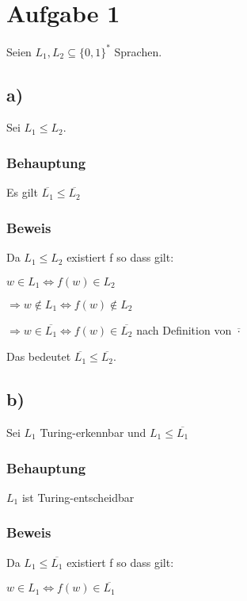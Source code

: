 \section*{Aufgabe 1}

Seien $L_1, L_2 \subseteq \{0,1\}^*$ Sprachen.

\subsection*{a)}

Sei $L_1 \leq L_2$.

\subsubsection*{Behauptung}

Es gilt $\overline{L_1} \leq \overline{L_2}$

\subsubsection*{Beweis}

Da $L_1 \leq L_2$ existiert f so dass gilt:

$w \in L_1 \Leftrightarrow f(w) \in L_2$

$\Rightarrow w \notin L_1 \Leftrightarrow f(w) \notin L_2$

$\Rightarrow w \in \overline{L_1} \Leftrightarrow f(w) \in \overline{L_2}$ nach Definition von $\overline{\cdot}$

Das bedeutet $\overline{L_1} \leq \overline{L_2}$.


\subsection*{b)}

Sei $L_1$ Turing-erkennbar und $L_1 \leq \overline{L_1}$ 

\subsubsection*{Behauptung}

$L_1$ ist Turing-entscheidbar


\subsubsection*{Beweis}

Da $L_1 \leq \overline{L_1}$ existiert f so dass gilt:

$w \in L_1 \Leftrightarrow f(w) \in \overline{L_1}$


